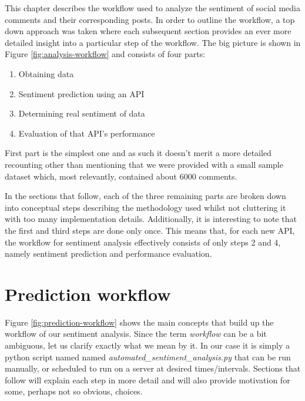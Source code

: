 This chapter describes the workflow used to analyze the sentiment of social media comments and their corresponding posts.
In order to outline the workflow, a top down approach was taken where each subsequent section provides an ever more detailed insight into a particular step of the workflow.
The big picture is shown in Figure \ref{fig:analysis-workflow} and consists of four parts:
\begin{enumerate}
  \item Obtaining data
  \item Sentiment prediction using an API
  \item Determining real sentiment of data
  \item Evaluation of that API's performance
\end{enumerate}

First part is the simplest one and as such it doesn't merit a more detailed recounting other than mentioning that we were provided with a small sample dataset which, most relevantly, contained about 6000 comments.

In the sections that follow, each of the three remaining parts are broken down into conceptual steps describing the methodology used whilst not cluttering it with too many implementation details.
Additionally, it is interesting to note that the first and third steps are done only once.
This means that, for each new API, the workflow for sentiment analysis effectively consists of only steps 2 and 4, namely sentiment prediction and performance evaluation.





\section{Prediction workflow\label{sec:sentiment-prediction-workflow}}

Figure \ref{fig:prediction-workflow} shows the main concepts that build up the workflow of our sentiment analysis. 
Since the term \textit{workflow} can be a bit ambiguous, let us clarify exactly what we mean by it. In our case it is simply a python script named named \textit{automated\_sentiment\_analysis.py} that can be run manually, or scheduled to run on a server at desired times/intervals. 
Sections that follow will explain each step in more detail and will also provide motivation for some, perhaps not so obvious, choices.


